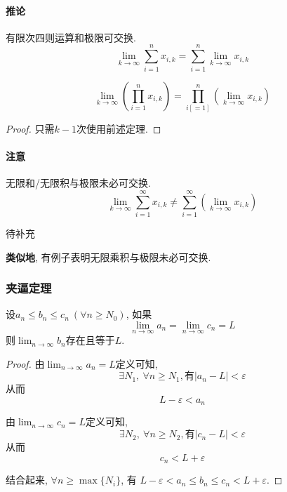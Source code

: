 
\paragraph{推论}
有限次四则运算和极限可交换.
\begin{equation}
    \lim_{k \to \infty}\sum_{i=1}^{n} x_{i,k} = \sum_{i=1}^{n} \lim_{k \to \infty} x_{i,k}
\end{equation}

\begin{equation}
    \lim_{k \to \infty}\left( \prod_{i=1}^{n} x_{i,k} \right) = \prod_{i[=1]}^{n} \left( \lim_{k \to \infty} x_{i,k} \right)  
\end{equation}

\begin{proof}
    只需$k-1$次使用前述定理.
\end{proof}
\paragraph{注意} 无限和/无限积与极限未必可交换.
\begin{equation}
    \lim_{k \to \infty}\sum_{i=1}^{\infty} x_{i,k} \neq \sum_{i=1}^{\infty} \left( \lim_{k \to \infty}x_{i,k} \right) 
\end{equation}
\begin{example}
   待补充 
\end{example}

\textbf{类似地}, 有例子表明无限乘积与极限未必可交换.
\subsubsection{夹逼定理}
\begin{theorem}
    设$a_n\le b_n\le c_n \ (\forall n \ge N_0 )$, 如果
    \begin{equation}
        \lim_{n \to \infty}a_n = \lim_{n \to \infty} c_n = L
    \end{equation}
    则$\displaystyle \lim_{n \to \infty} b_n$存在且等于$L$.
\end{theorem}
\begin{proof}
    由$\displaystyle \lim_{n \to \infty}a_n = L$定义可知, 
    \begin{equation}
      \exists N_1,\ \forall n\ge N_1, \text{有} \left| a_n - L \right| < \varepsilon
    \end{equation}
    从而
    \begin{equation}
      L -\varepsilon < a_n
    \end{equation}

    由$\displaystyle \lim_{n \to \infty}c_n = L$定义可知, 
    \begin{equation}
      \exists N_2,\ \forall n\ge N_2, \text{有} \left| c_n - L \right| < \varepsilon
    \end{equation}
    从而
    \begin{equation}
      c_n < L+\varepsilon
    \end{equation}

    结合起来, $\forall  n \ge \max \{ N_i \}$, 有 $L-\varepsilon < a_n \le b_n \le c_n < L+\varepsilon$.
\end{proof}

